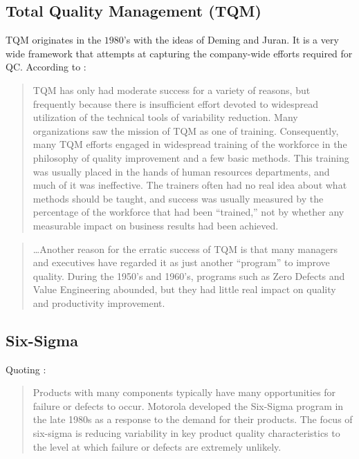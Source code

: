 \documentclass[12pt,a4paper]{report}
\begin{document}
\subsection{Total Quality Management (TQM)}
TQM originates in the $1980$'s with the ideas of Deming and Juran.
It is a very wide framework that attempts at capturing the company-wide efforts required for QC. 
According to \citet[p.23]{montgomery_introduction_2007}:
\begin{quote}
TQM has only had moderate success for a variety of reasons, but frequently because there is insufficient effort devoted to widespread utilization of the technical tools of variability reduction. Many organizations saw the mission of TQM as one of training. Consequently, many TQM efforts engaged in widespread training of the workforce in the philosophy of quality improvement and a few basic methods.
This training was usually placed in the hands of human resources departments, and much of it was ineffective. The trainers often had no real idea about what methods should be taught, and success was usually measured by the percentage of the workforce that had been ``trained,'' not by whether any measurable impact on business results had been achieved.
\end{quote}

\begin{quote}
\dots Another reason for the erratic success of TQM is that many managers and executives
have regarded it as just another “program” to improve quality. During the 1950's and 1960's, programs such as Zero Defects and Value Engineering abounded, but they had little real impact on quality and productivity improvement.
\end{quote}



\subsection{Six-Sigma}
Quoting \cite{montgomery_introduction_2007}:
\begin{quote}
Products with many components typically have many opportunities for failure or defects to occur. Motorola developed the Six-Sigma program in the late 1980s as a response to the demand for their products. The focus of six-sigma is reducing variability in key product quality characteristics to the level at which failure or defects are extremely unlikely.
\end{quote}
\end{document}
